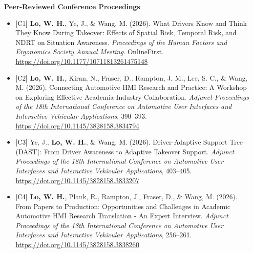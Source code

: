 \documentclass[11pt]{article}
\begin{document}
\vspace{0.6em}


\textbf{Peer-Reviewed Conference Proceedings}

\begin{itemize}[leftmargin=*, topsep=0pt, itemsep=6pt]

  \item \begin{samepage}{[C1]} \textbf{Lo, W. H.}, Ye, J., \& Wang, M. (2026). What Drivers Know and Think They Know During Takeover: Effects of Spatial Risk, Temporal Risk, and NDRT on Situation Awareness. \textit{Proceedings of the Human Factors and Ergonomics Society Annual Meeting}. OnlineFirst. \href{https://doi.org/10.1177/10711813261475148}{\url{https://doi.org/10.1177/10711813261475148}}
  \par\end{samepage}

  \item \begin{samepage}{[C2]} \textbf{Lo, W. H.}, Kiran, N., Fraser, D., Rampton, J. M., Lee, S. C., \& Wang, M. (2026). Connecting Automotive HMI Research and Practice: A Workshop on Exploring Effective Academia-Industry Collaboration. \textit{Adjunct Proceedings of the 18th International Conference on Automotive User Interfaces and Interactive Vehicular Applications}, 390--393. \href{https://doi.org/10.1145/3828158.3834794}{\url{https://doi.org/10.1145/3828158.3834794}}
  \par\end{samepage}

  \item \begin{samepage}{[C3]} Ye, J., \textbf{Lo, W. H.}, \& Wang, M. (2026). Driver-Adaptive Support Tree (DAST): From Driver Awareness to Adaptive Takeover Support. \textit{Adjunct Proceedings of the 18th International Conference on Automotive User Interfaces and Interactive Vehicular Applications}, 403--405. \href{https://doi.org/10.1145/3828158.3833207}{\url{https://doi.org/10.1145/3828158.3833207}}
  \par\end{samepage}

  \item \begin{samepage}{[C4]} \textbf{Lo, W. H.}, Plank, R., Rampton, J., Fraser, D., \& Wang, M. (2026). From Papers to Production: Opportunities and Challenges in Academic Automotive HMI Research Translation - An Expert Interview. \textit{Adjunct Proceedings of the 18th International Conference on Automotive User Interfaces and Interactive Vehicular Applications}, 256--261. \href{https://doi.org/10.1145/3828158.3838260}{\url{https://doi.org/10.1145/3828158.3838260}}
  \par\end{samepage}


\end{itemize}
\end{document}
